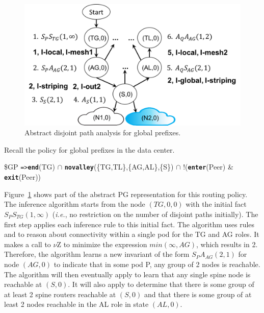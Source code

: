 \documentclass[numbers, 10pt]{sigplanconf}
\newcommand{\IE}{\emph{i.e.}}
\newcommand{\KW}[1]{\texttt{\small\bfseries{#1}}}
\newcommand{\Path}{\texttt{=>}}
\newcommand{\Exit}{\KW{exit}}
\newcommand{\End}{\KW{end}}
\newcommand{\Enter}{\KW{enter}}
\newcommand{\Novalley}{\KW{novalley}}
\begin{document}
\begin{figure}
  \begin{center}
    \includegraphics[width=\columnwidth]{figures/analysis}
  \end{center}
  \vspace{-1em}
  \caption{Abstract disjoint path analysis for global prefixes. \label{fig:compilation-times}}
  \label{fig:example-inference}
  \vspace{-.8em}
\end{figure}

Recall the policy for global prefixes in the data center.
%
\begin{code}
\$GP \Path \End(TG) \ensuremath{\cap}
       \Novalley(\{TG,TL\},\{AG,AL\},\{S\}) \ensuremath{\cap}
       !(\Enter(Peer) & \Exit(Peer))
\end{code}
\noindent
%
Figure~\ref{fig:example-inference} shows part of the abstract PG representation for this routing policy. The inference algorithm starts from the node $(TG,0,0)$ with the initial fact $S_P S_{TG}(1,\infty)$ (\IE, no restriction on the number of disjoint paths initially).
%
The first step applies each inference rule to this initial fact. The algorithm uses rules  and  to reason about connectivity within a single pod for the TG and AG roles. It makes a call to $\nu$Z to minimize the expression $min(\infty, AG)$, which results in 2. Therefore, the algorithm learns a new invariant of the form $S_P A_{AG} (2,1)$ for node $(AG, 0)$ to indicate that in some pod P, any group of 2 nodes is reachable.
%
The algorithm will then eventually apply  to learn that any single spine node is reachable at $(S,0)$. It will also apply  to determine that there is some group of at least 2 spine routers reachable at $(S,0)$ and that there is some group of at least 2 nodes reachable in the AL role in state $(AL,0)$.
\end{document}

